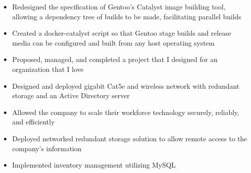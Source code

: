 \documentclass[10pt,letterpaper]{altacv}
\begin{document}



\begin{fullwidth}
\makecvheader
\end{fullwidth}


\begin{itemize}
    \item Redesigned the specification of Gentoo's Catalyst image building tool, allowing a dependency tree of builds to be made, facilitating parallel builds
    \item Created a docker-catalyst script so that Gentoo stage builds and release media can be configured and built from any host operating system
    \item Proposed, managed, and completed a project that I designed for an organization that I love
\end{itemize}


\divider

\begin{itemize}
\item Designed and deployed gigabit Cat5e and wireless network with redundant storage and an Active Directory server
\item Allowed the company to scale their workforce technology securely, reliably, and efficiently
\end{itemize}

\divider

\begin{itemize}
\item Deployed networked redundant storage solution to allow remote access to the company's information 
\item Implemented inventory management utilizing MySQL
\end{itemize}
\end{document}
